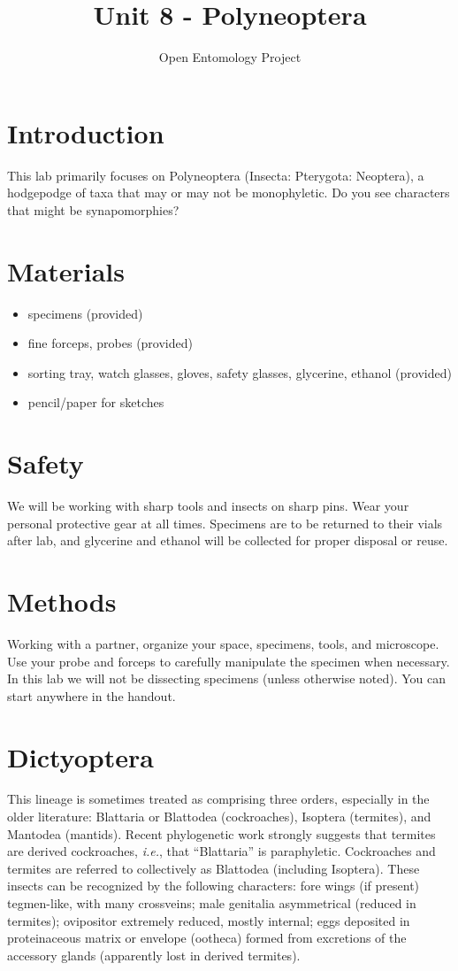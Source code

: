 \documentclass[letterpaper, 11pt]{article}
\title{Unit 8 - Polyneoptera}
\author{Open Entomology Project}
\begin{document}
\cleanlookdateon %
\maketitle
\thispagestyle{fancy}
\section*{Introduction}
This lab primarily focuses on Polyneoptera (Insecta: Pterygota: Neoptera), a hodgepodge of taxa that may or may not be monophyletic. Do you see characters that might be synapomorphies? 

\section*{Materials}
\begin{itemize}
\item specimens (provided)
\item fine forceps, probes (provided)
\item sorting tray, watch glasses, gloves, safety glasses, glycerine, ethanol (provided)
\item pencil/paper for sketches
\end{itemize}

\section*{Safety}
We will be working with sharp tools and insects on sharp pins. Wear your personal protective gear at all times. Specimens are to be returned to their vials after lab, and glycerine and ethanol will be collected for proper disposal or reuse.

\section*{Methods}
Working with a partner, organize your space, specimens, tools, and microscope. Use your probe and forceps to carefully manipulate the specimen when necessary. In this lab we will not be dissecting specimens (unless otherwise noted). You can start anywhere in the handout.

\section{Dictyoptera}
This lineage is sometimes treated as comprising three orders, especially in the older literature: Blattaria or Blattodea (cockroaches), Isoptera (termites), and Mantodea (mantids). Recent phylogenetic work strongly suggests that termites are derived cockroaches, \textit{i.e.}, that ``Blattaria'' is paraphyletic. Cockroaches and termites are referred to collectively as Blattodea (including Isoptera). These insects can be recognized by the following characters: fore wings (if present) tegmen-like, with many crossveins; male genitalia asymmetrical (reduced in termites); ovipositor extremely reduced, mostly internal; eggs deposited in proteinaceous matrix or envelope (ootheca) formed from excretions of the accessory glands (apparently lost in derived termites).
\end{document}
